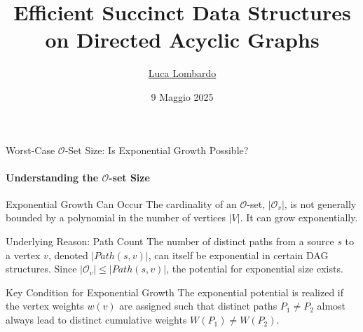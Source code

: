 \documentclass{beamer}
\title{Efficient Succinct Data Structures on Directed Acyclic Graphs}
\author{\href{mailto:l.lombardo11@studenti.unipi.it}{Luca Lombardo}} %
\date{9 Maggio 2025}
\begin{document}
\maketitle




\backmatter

\begin{frame}[noframenumbering]{Worst-Case $\mathcal{O}$-Set Size: Is Exponential Growth Possible?}
    \framesubtitle{Understanding the $\mathcal{O}$-set Size}

    \begin{block}{Exponential Growth Can Occur}
        The cardinality of an $\mathcal{O}$-set, $|\mathcal{O}_v|$, is not generally bounded by a polynomial in the number of vertices $|V|$. It can grow exponentially.
    \end{block}

    \begin{block}{Underlying Reason: Path Count}
        The number of distinct paths from a source $s$ to a vertex $v$, denoted $|Path(s, v)|$, can itself be exponential in certain DAG structures. Since $|\mathcal{O}_v| \le |Path(s, v)|$, the potential for exponential size exists.
    \end{block}

    \pause %

    \begin{alertblock}{Key Condition for Exponential Growth}
        The exponential potential is realized if the vertex weights $w(v)$ are assigned such that distinct paths $P_1 \neq P_2$ almost always lead to distinct cumulative weights $W(P_1) \neq W(P_2)$.
    \end{alertblock}

\end{frame}
\end{document}
